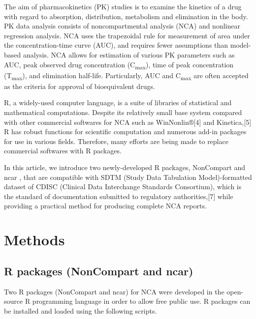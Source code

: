\documentclass[12pt,]{krantz}
\theoremstyle{definition}
\theoremstyle{definition}
\theoremstyle{definition}
\theoremstyle{remark}
\begin{document}
The aim of pharmacokinetics (PK) studies is to examine the kinetics of a
drug with regard to absorption, distribution, metabolism and elimination
in the body. PK data analysis consists of noncompartmental analysis
(NCA) and nonlinear regression analysis. \citep{acharya, gab} NCA uses
the trapezoidal rule for measurement of area under the
concentration-time curve (AUC), and requires fewer assumptions than
model-based analysis. \citep{gab} NCA allows for estimation of various
PK parameters such as AUC, peak observed drug concentration
(C\textsubscript{max}), time of peak concentration
(T\textsubscript{max}), and elimination half-life. Particularly, AUC and
C\textsubscript{max} are often accepted as the criteria for approval of
bioequivalent drugs.

R, a widely-used computer language, is a suite of libraries of
statistical and mathematical computations. \citep{R-base} Despite its
relatively small base system compared with other commercial softwares
for NCA such as WinNonlin®{[}4{]} and Kinetica,{[}5{]} R has robust
functions for scientific computation and numerous add-in packages for
use in various fields. \citep{kim2015r} Therefore, many efforts are
being made to replace commercial softwares with R packages.

In this article, we introduce two newly-developed R packages, NonCompart
\citep{R-NonCompart} and ncar \citep{R-ncar}, that are compatible with
SDTM (Study Data Tabulation Model)-formatted dataset of CDISC (Clinical
Data Interchange Standards Consortium), which is the standard of
documentation submitted to regulatory authorities,{[}7{]} while
providing a practical method for producing complete NCA reports.
\citep{kim_2018}

\hypertarget{methods}{%
\chapter{Methods}\label{methods}}

\hypertarget{r-packages-noncompart-and-ncar}{%
\section{R packages (NonCompart and
ncar)}\label{r-packages-noncompart-and-ncar}}

Two R packages (NonCompart and ncar) for NCA were developed in the
open-source R programming language in order to allow free public use. R
packages can be installed and loaded using the following scripts.
\end{document}
